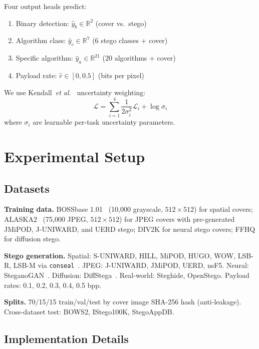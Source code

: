\documentclass[conference]{IEEEtran}
\newcommand{\etal}{\textit{et al.}}
\begin{document}
Four output heads predict:
\begin{enumerate}
  \item Binary detection: $\hat{y}_b \in \mathbb{R}^2$ (cover vs.\ stego)
  \item Algorithm class: $\hat{y}_c \in \mathbb{R}^7$ (6 stego classes + cover)
  \item Specific algorithm: $\hat{y}_a \in \mathbb{R}^{21}$ (20 algorithms + cover)
  \item Payload rate: $\hat{r} \in [0, 0.5]$ (bits per pixel)
\end{enumerate}

We use Kendall~\etal~\cite{kendall2018multi} uncertainty weighting:
\begin{equation}
  \mathcal{L} = \sum_{i=1}^{4} \frac{1}{2\sigma_i^2} \mathcal{L}_i + \log \sigma_i
  \label{eq:loss}
\end{equation}
where $\sigma_i$ are learnable per-task uncertainty parameters.

\section{Experimental Setup}
\label{sec:experiments}

\subsection{Datasets}

\textbf{Training data.}
BOSSbase 1.01~\cite{bas2011break} (10,000 grayscale, $512 \times 512$) for spatial covers; ALASKA2~\cite{cogranne2020alaska} (75,000 JPEG, $512 \times 512$) for JPEG covers with pre-generated JMiPOD, J-UNIWARD, and UERD stego; DIV2K for neural stego covers; FFHQ for diffusion stego.

\textbf{Stego generation.}
Spatial: S-UNIWARD, HILL, MiPOD, HUGO, WOW, LSB-R, LSB-M via \texttt{conseal}~\cite{butora2023conseal}.
JPEG: J-UNIWARD, JMiPOD, UERD, nsF5.
Neural: SteganoGAN~\cite{zhang2019steganogan}.
Diffusion: DiffStega~\cite{wei2024diffstega}.
Real-world: Steghide, OpenStego.
Payload rates: 0.1, 0.2, 0.3, 0.4, 0.5 bpp.

\textbf{Splits.}
70/15/15 train/val/test by cover image SHA-256 hash (anti-leakage).
Cross-dataset test: BOWS2, IStego100K, StegoAppDB.

\subsection{Implementation Details}
\end{document}
